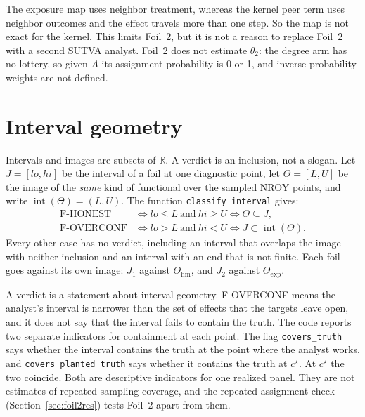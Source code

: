 \documentclass[11pt]{article}
\newcommand{\hm}{\mathrm{hm}}
\newcommand{\expset}{\mathrm{exp}}
\newcommand{\interior}{\operatorname{int}}
\newcommand{\Jone}{J_1}
\newcommand{\Jtwo}{J_2}
\begin{document}
The exposure map uses neighbor treatment, whereas the kernel peer term
uses neighbor outcomes and the effect travels more than one step. So the
map is not exact for the kernel. This limits Foil~2, but it is not a
reason to replace Foil~2 with a second SUTVA analyst. Foil~2 does not
estimate $\theta_2$: the degree arm has no lottery, so given $A$ its assignment
probability is 0 or 1, and inverse-probability weights are not defined.

\section{Interval geometry}
\label{sec:geometry}

Intervals and images are subsets of $\mathbb{R}$. A verdict is an inclusion, not
a slogan. Let $J=[lo,hi]$ be the interval of a foil at one diagnostic point, let
$\Theta=[L,U]$ be the image of the \emph{same} kind of functional over the
\ThetaSample{} sampled NROY points, and write $\interior(\Theta)=(L,U)$. The function \texttt{classify\_interval}
gives:
\begin{align}
  \text{F-HONEST}
  &\iff lo\le L\ \text{and}\ hi\ge U
  \iff \Theta\subseteq J, \\
  \text{F-OVERCONF}
  &\iff lo>L\ \text{and}\ hi<U
  \iff J\subset\interior(\Theta).
\end{align}
Every other case has no verdict, including an interval that overlaps the
image with neither inclusion and an interval with an end that is not
finite. Each foil goes against its own image: $\Jone$ against $\Theta_{\hm}$, and $\Jtwo$
against $\Theta_{\expset}$.

A verdict is a statement about interval geometry. F-OVERCONF means the
analyst's interval is narrower than the set of effects that the targets
leave open, and it does not say that the interval fails to contain the
truth. The code reports two separate indicators for containment at each
point. The flag \texttt{covers\_truth} says whether the interval
contains the truth at the point where the analyst works, and
\texttt{covers\_planted\_truth} says whether it contains the truth at
$c^\star$. At $c^\star$ the two coincide. Both are descriptive
indicators for one realized panel. They are not estimates of
repeated-sampling coverage, and the repeated-assignment check
(Section~\ref{sec:foil2res}) tests Foil~2 apart from them.

\end{document}

